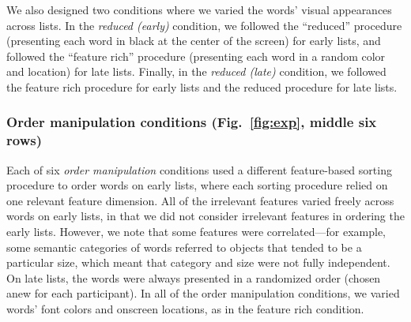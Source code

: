 \documentclass[11pt]{article}
\begin{document}
We also designed two conditions where we varied the words' visual appearances
across lists. In the \textit{reduced (early)} condition, we followed the
``reduced'' procedure (presenting each word in black at the center of the
screen) for early lists, and followed the ``feature rich'' procedure
(presenting each word in a random color and location) for late lists. Finally,
in the \textit{reduced (late)} condition, we followed the feature rich
procedure for early lists and the reduced procedure for late lists.

\subsubsection*{Order manipulation conditions (Fig.~\ref{fig:exp}, middle six
rows)}

Each of six \textit{order manipulation} conditions used a different
feature-based sorting procedure to order words on early lists, where each
sorting procedure relied on one relevant feature dimension. All of the
irrelevant features varied freely across words on early lists, in that we did
not consider irrelevant features in ordering the early lists. However, we note
that some features were correlated---for example, some semantic categories of
words referred to objects that tended to be a particular size, which meant that
category and size were not fully independent. On late lists, the words were
always presented in a randomized order (chosen anew for each participant). In
all of the order manipulation conditions, we varied words' font colors and
onscreen locations, as in the feature rich condition.
\end{document}
